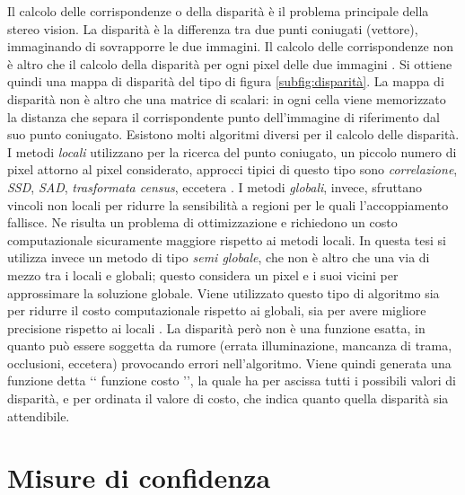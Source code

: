 \documentclass[12pt]{report}
\newcommand{\nullpage}{\newpage\null\thispagestyle{empty}}  %
\begin{document}
			
			
			Il calcolo delle corrispondenze o della disparità è il problema principale della stereo vision.	La disparità è la differenza tra due punti coniugati (vettore), immaginando di sovrapporre le due immagini. Il calcolo delle corrispondenze non è altro che il calcolo della disparità per ogni pixel delle due immagini \cite{fusiello}. Si ottiene quindi una mappa di disparità del tipo di figura \ref{subfig:disparità}. La mappa di disparità non è altro che una matrice di scalari: in ogni cella viene memorizzato la distanza che separa il corrispondente punto dell'immagine di riferimento dal suo punto coniugato.\newline
			Esistono molti algoritmi diversi per il calcolo delle disparità. I metodi \textit{locali} utilizzano per la ricerca del punto coniugato, un piccolo numero di pixel attorno al pixel considerato, approcci tipici di questo tipo sono \textit{correlazione}, \textit{SSD}, \textit{SAD}, \textit{trasformata census}, eccetera \cite{correlation}. I metodi \textit{globali}, invece, sfruttano vincoli non locali per ridurre la sensibilità a regioni per le quali l'accoppiamento fallisce. Ne risulta un problema di ottimizzazione e richiedono un costo computazionale sicuramente maggiore rispetto ai metodi locali. In questa tesi si utilizza invece un metodo di tipo \textit{semi globale}, che non è altro che una via di mezzo tra i locali e globali; questo considera un pixel e i suoi vicini per approssimare la soluzione globale. Viene utilizzato questo tipo di algoritmo sia per ridurre il costo computazionale rispetto ai globali, sia per avere migliore precisione rispetto ai locali \cite{SGM}. La disparità però non è una funzione esatta, in quanto può essere soggetta da rumore (errata illuminazione, mancanza di trama, occlusioni, eccetera) provocando errori nell'algoritmo. Viene quindi generata una funzione detta ‘‘ funzione costo ’’, la quale ha per ascissa tutti i possibili valori di disparità, e per ordinata il valore di costo, che indica quanto quella disparità sia attendibile.  
			
			

	\nullpage
	
	\chapter{Misure di confidenza}
	\label{sec:confidenza}
	\pagestyle{fancy}
	
\end{document}
